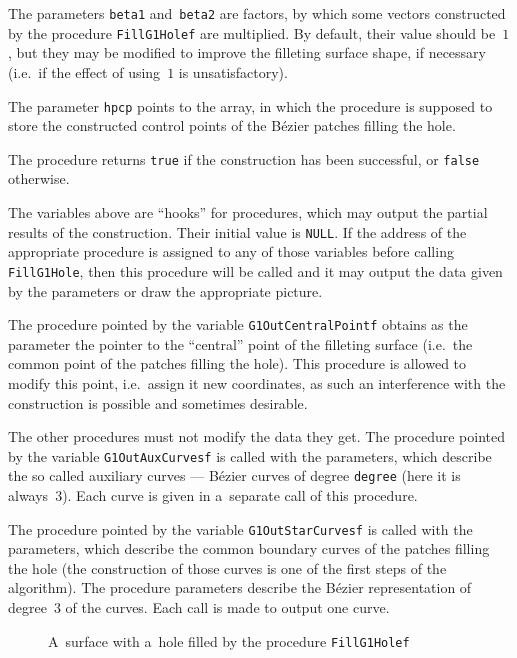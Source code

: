 The parameters \texttt{beta1} and~\texttt{beta2} are factors, by which
some vectors constructed by the procedure \texttt{FillG1Holef} are multiplied.
By default, their value should be~$1$, but they may be modified to
improve the filleting surface shape, if necessary (i.e.\ if the effect
of using~$1$ is unsatisfactory).

The parameter \texttt{hpcp} points to the array, in which the procedure
is supposed to store the constructed control points of the B\'{e}zier
patches filling the hole.

The procedure returns \texttt{true} if the construction has been successful,
or \texttt{false} otherwise.

\vspace{\bigskipamount}
The variables above are ``hooks'' for procedures, which may output the
partial results of the construction. Their initial value is \texttt{NULL}.
If the address of the appropriate procedure is assigned to any of those
variables before calling \texttt{FillG1Hole}, then this procedure will be
called and it may output the data given by the parameters or
draw the appropriate picture.

The procedure pointed by the variable \texttt{G1OutCentralPointf} obtains as
the parameter the pointer to the ``central'' point of the filleting surface
(i.e.\ the common point of the patches filling the hole). This procedure
is allowed to modify this point, i.e.\ assign it new coordinates, as such
an interference with the construction is possible and sometimes desirable.

The other procedures must not modify the data they get. The procedure
pointed by the variable \texttt{G1OutAuxCurvesf} is called with the
parameters, which describe the so called auxiliary curves --- B\'{e}zier
curves of degree \texttt{degree} (here it is always~$3$). Each curve is
given in a~separate call of this procedure.

The procedure pointed by the variable \texttt{G1OutStarCurvesf} is
called with the parameters, which describe the common boundary curves
of the patches filling the hole (the construction of those curves is
one of the first steps of the algorithm). The procedure parameters
describe the B\'{e}zier representation of degree~$3$ of the curves.
Each call is made to output one curve.%
\begin{figure}[ht]
  \centerline{}
  \caption{\label{fig:g1:patch:num:2}A~surface with a~hole filled by the procedure
    \texttt{FillG1Holef}}
\end{figure}

